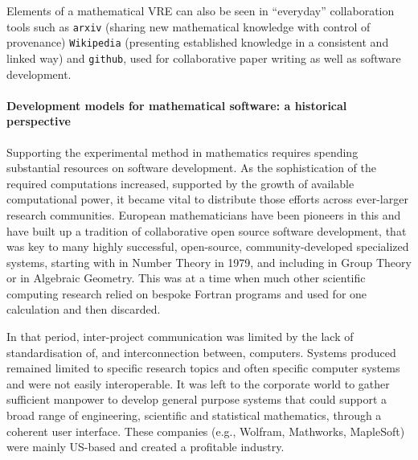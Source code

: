Elements of a mathematical VRE can also be seen in ``everyday''
collaboration tools such as \texttt{arxiv} (sharing new mathematical
knowledge with control of provenance) \texttt{Wikipedia} (presenting
established knowledge in a consistent and linked way) and
\texttt{github}, used for collaborative paper writing as
well as software development.



\paragraph{Development models for mathematical software: a historical
  perspective}

Supporting the experimental method in mathematics requires spending
substantial resources
on software development. As the sophistication of the required
computations increased, supported by the growth of available
computational power, it became vital to distribute those efforts across
ever-larger research communities. European mathematicians have been
pioneers in this and have built up a tradition of collaborative open
source software development, that was key
to many highly successful,
open-source, community-developed specialized systems, starting with
\PariGP in Number Theory in 1979, and including \GAP in Group Theory
or \Singular in Algebraic Geometry. This was at a time when much other
scientific computing research relied on bespoke Fortran programs and used
for one calculation and then discarded.
%



In that period, inter-project communication was limited by the lack of
standardisation of, and interconnection between, computers. Systems
produced remained limited
to specific research topics and often specific computer systems and
were not easily interoperable. It was left to the
corporate world to gather sufficient manpower to develop general
purpose systems that could support a broad range of engineering,
scientific and statistical mathematics, through a coherent user
interface. These companies (e.g., Wolfram, Mathworks, MapleSoft) were
mainly US-based and created a profitable industry.


